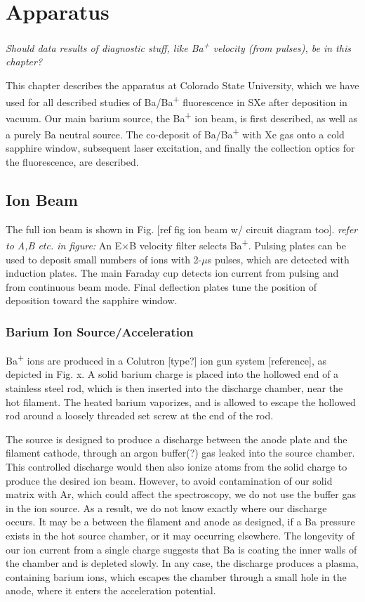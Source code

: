\chapter{Apparatus}

{\color{gray}\emph{Should data results of diagnostic stuff, like Ba\textsuperscript{+} velocity (from pulses), be in this chapter?}}

This chapter describes the apparatus at Colorado State University, which we have used for all described studies of Ba/Ba\textsuperscript{+} fluorescence in SXe after deposition in vacuum.  Our main barium source, the Ba\textsuperscript{+} ion beam, is first described, as well as a purely Ba neutral source.  The co-deposit of Ba/Ba\textsuperscript{+} with Xe gas onto a cold sapphire window, subsequent laser excitation, and finally the collection optics for the fluorescence, are described.

\section{Ion Beam}

The full ion beam is shown in Fig. [ref fig ion beam w/ circuit diagram too].  {\color{red}\emph{refer to A,B etc. in figure:  }}An E$\times$B velocity filter selects Ba\textsuperscript{+}.  Pulsing plates can be used to deposit small numbers of ions with {\color{red}2-$\mu$s} pulses, which are detected with induction plates.  The main Faraday cup detects ion current from pulsing and from continuous beam mode.  Final deflection plates tune the position of deposition toward the sapphire window.

\subsection{Barium Ion Source/Acceleration}

Ba\textsuperscript{+} ions are produced in a Colutron [type?] ion gun system [reference], as depicted in Fig. x.  A solid barium charge is placed into the hollowed end of a stainless steel rod, which is then inserted into the discharge chamber, near the hot filament.  The heated barium vaporizes, and is allowed to escape the hollowed rod around a loosely threaded set screw at the end of the rod.

The source is designed to produce a discharge between the anode plate and the filament cathode, through an argon buffer(?) gas leaked into the source chamber.  This controlled discharge would then also ionize atoms from the solid charge to produce the desired ion beam.  However, to avoid contamination of our solid matrix with Ar, which could affect the spectroscopy, we do not use the buffer gas in the ion source.  As a result, we do not know exactly where our discharge occurs.  It may be a between the filament and anode as designed, if a Ba pressure exists in the hot source chamber, or it may occurring elsewhere.  The longevity of our ion current from a single charge suggests that Ba is coating the inner walls of the chamber and is depleted slowly.  In any case, the discharge produces a plasma, containing barium ions, which escapes the chamber through a small hole in the anode, where it enters the acceleration potential.

